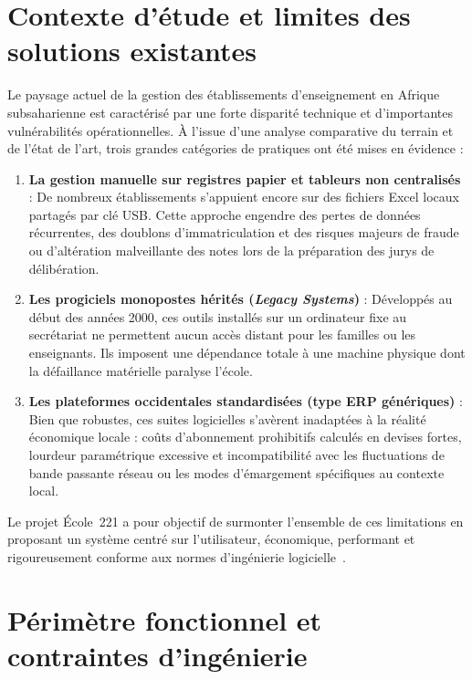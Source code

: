 \section{Contexte d'étude et limites des solutions existantes}

Le paysage actuel de la gestion des établissements d'enseignement en Afrique subsaharienne est caractérisé par une forte disparité technique et d'importantes vulnérabilités opérationnelles. À l'issue d'une analyse comparative du terrain et de l'état de l'art, trois grandes catégories de pratiques ont été mises en évidence :

\begin{enumerate}
  \item \textbf{La gestion manuelle sur registres papier et tableurs non centralisés} :
  De nombreux établissements s'appuient encore sur des fichiers Excel locaux partagés par clé USB. Cette approche engendre des pertes de données récurrentes, des doublons d'immatriculation et des risques majeurs de fraude ou d'altération malveillante des notes lors de la préparation des jurys de délibération.
  
  \item \textbf{Les progiciels monopostes hérités (\emph{Legacy Systems})} :
  Développés au début des années 2000, ces outils installés sur un ordinateur fixe au secrétariat ne permettent aucun accès distant pour les familles ou les enseignants. Ils imposent une dépendance totale à une machine physique dont la défaillance matérielle paralyse l'école.
  
  \item \textbf{Les plateformes occidentales standardisées (type ERP génériques)} :
  Bien que robustes, ces suites logicielles s'avèrent inadaptées à la réalité économique locale : coûts d'abonnement prohibitifs calculés en devises fortes, lourdeur paramétrique excessive et incompatibilité avec les fluctuations de bande passante réseau ou les modes d'émargement spécifiques au contexte local.
\end{enumerate}

Le projet École~221 a pour objectif de surmonter l'ensemble de ces limitations en proposant un système centré sur l'utilisateur, économique, performant et rigoureusement conforme aux normes d'ingénierie logicielle~\cite{iso25010}.

\section{Périmètre fonctionnel et contraintes d'ingénierie}

